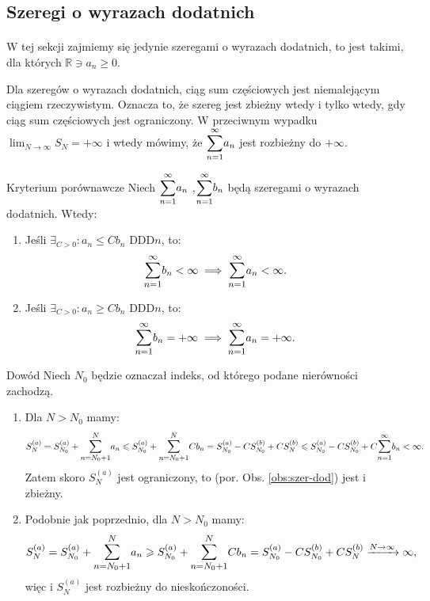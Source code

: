 \documentclass{article}
\numberwithin{defi}{section}
\numberwithin{defi}{section}
\newcommand{\R}{\mathbb{R}}
\newcommand{\oo}{\infty}
\newcommand{\bsum}[2]{\mathlarger{\sum_{#1}^{#2}}}
\newcommand{\szerI}[1]{\bsum{n=1}{\oo} #1_n}
\newcommand{\gras}[2]{\lim_{#1 \to \oo} #2_{#1}}
\begin{document}
\subsection{Szeregi o wyrazach dodatnich}

\paragraph{} W tej sekcji zajmiemy się jedynie szeregami o wyrazach dodatnich, to jest takimi, dla których $\R \ni a_n \geqslant 0$. 
\begin{obs}{} \label{obs:szer-dod}
    Dla szeregów o wyrazach dodatnich, ciąg sum częściowych jest niemalejącym ciągiem rzeczywistym. Oznacza to, że szereg jest zbieżny wtedy i tylko wtedy, gdy ciąg sum częściowych jest ograniczony. W przeciwnym wypadku $\gras{N}{S} = + \oo$ i wtedy mówimy, że $\szerI{a}$ jest rozbieżny do $+\oo$. 
\end{obs}

\begin{twier}{Kryterium porównawcze} \label{twier:kryt-por}
    Niech $\szerI{a}$ ,$\szerI{b}$ będą szeregami o wyrazach dodatnich. Wtedy: \begin{enumerate}
        \item Jeśli $\exists_{C > 0}: a_n \leqslant C b_n$ DDD$n$, to: \begin{equation}
            \szerI{b} < \oo \implies \szerI{a} < \oo.
        \end{equation}
        \item Jeśli $\exists_{C > 0}: a_n \geqslant C b_n$ DDD$n$, to: \begin{equation}
            \szerI{b} = +\oo \implies \szerI{a} = +\oo.
        \end{equation}
    \end{enumerate}
\end{twier}

\begin{dow}{Dowód}
    Niech $N_0$ będzie oznaczał indeks, od którego podane nierówności zachodzą.
    \begin{enumerate}
        \item Dla $N > N_0$ mamy: \begin{equation*}
            S_N^{(a)} = S_{N_0}^{(a)} + \bsum{n = N_0 +1}{N}a_n \leqslant S_{N_0}^{(a)} + \bsum{n = N_0 +1}{N}C b_n = S_{N_0}^{(a)} - C S_{N_0}^{(b)} + C S_N^{(b)} \leqslant S_{N_0}^{(a)} - C S_{N_0}^{(b)} + C \szerI{b} < \oo. 
        \end{equation*} Zatem skoro $S_N^{(a)}$ jest ograniczony, to (por. Obs. \ref{obs:szer-dod}) jest i zbieżny.
        \item Podobnie jak poprzednio, dla $N > N_0$ mamy: \begin{equation*}
            S_N^{(a)} = S_{N_0}^{(a)} + \bsum{n = N_0 +1}{N}a_n \geqslant S_{N_0}^{(a)} + \bsum{n = N_0 +1}{N}C b_n = S_{N_0}^{(a)} - C S_{N_0}^{(b)} + C S_N^{(b)} \xrightarrow[]{N \to \oo} \oo,
        \end{equation*} więc i $S_N^{(a)}$ jest rozbieżny do nieskończoności.
    \end{enumerate}
\end{dow}
\end{document}
